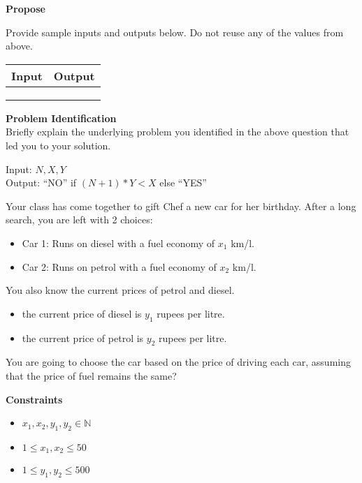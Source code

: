 \documentclass[a4paper]{exam}
\newcommand\heading[1]{\textbf{#1}}
\newcommand\inn{\in \mathbb{N}}
\begin{document}
\begin{questions}
    \heading{Propose}

    Provide sample inputs and outputs below. Do not reuse any of the values from above.

    \begin{tabularx}{\textwidth}{|X|X|}
        \rowcolor{gray!50}
        \hline
        Input & Output \\ \hline\hline
              &        \\\hline
              &        \\\hline
              &        \\\hline
    \end{tabularx}
    \heading{Problem Identification}\\
    Briefly explain the underlying problem you identified in the above question that led you to your solution.

  \begin{mdframed}
    Input: $N,X,Y$\\
    Output: ``NO'' if $(N+1)*Y<X$ else ``YES''
  \end{mdframed}


    Your class has come together to gift Chef a new car for her birthday. After a long search, you are left with 2 choices:
    \begin{itemize}
        \item Car 1: Runs on diesel with a fuel economy of $x_1$ km/l.
        \item Car 2: Runs on petrol with a fuel economy of $x_2$ km/l.
    \end{itemize}

    You also know the current prices of petrol and diesel.

    \begin{itemize}
        \item the current price of diesel is $y_1$ rupees per litre.
        \item the current price of petrol is $y_2$ rupees per litre.
    \end{itemize}

    You are going to choose the car based on the price of driving each car, assuming that the price of fuel remains the same?

    \heading{Constraints}
    \begin{itemize}
        \item  $x_1,x_2,y_1,y_2 \inn$
        \item  $1\le x_1,x_2 \le 50$
        \item  $1\le y_1,y_2 \le 500$
    \end{itemize}



\end{questions}
\end{document}
